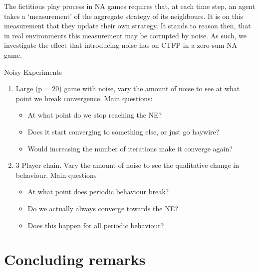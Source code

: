 \documentclass{article}
\theoremstyle{definition}
\begin{document}
	The fictitious play process in NA games requires that, at each time step, an agent takes a
	`measurement' of the aggregate strategy of its neighbours. It is on this measurement that they
	update their own strategy. It stands to reason then, that in real environments this measurement
	may be corrupted by noise. As such, we investigate the effect that introducing noise has on CTFP
	in a zero-sum NA game.

	Noisy Experiments
	\begin{enumerate}
		\item Large (p = 20) game with noise, vary the amount of noise to see at what point we break
		convergence. Main questions: \begin{itemize}
			\item At what point do we stop reaching the NE?
			\item Does it start converging to something else, or just go haywire?
			\item Would increasing the number of iterations make it converge again?
		\end{itemize}
			
		\item 3 Player chain. Vary the amount of noise to see the qualitative change in behaviour.
		Main questions \begin{itemize}
			\item At what point does periodic behaviour break?
			\item Do we actually always converge towards the NE?
			\item Does this happen for all periodic behaviour?
		\end{itemize}
	\end{enumerate}
	
	\section{Concluding remarks}
\end{document}
